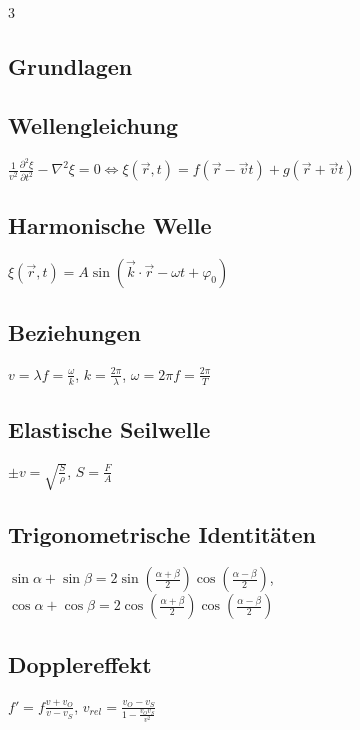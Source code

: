 \documentclass{article}
\begin{document}
\begin{multicols*}{3} 

\vspace{-10pt}

\begin{tcolorbox}[colframe=bg1]
\section{Grundlagen}
\subsection{Wellengleichung}
$\frac{1}{v^2} \frac{\partial^2 \xi}{\partial t^2} - \nabla^2 \xi = 0
\iff \xi(\vec{r}, t) = f(\vec{r} - \vec{v} t) + g(\vec{r} + \vec{v} t)$
\vspace{10pt}

\subsection{Harmonische Welle}
$\xi(\vec{r}, t) = A \sin(\vec{k} \cdot \vec{r} - \omega t + \varphi_0)$
\vspace{10pt}

\subsection{Beziehungen}
$v = \lambda f = \frac{\omega}{k}$, \quad
$k = \frac{2 \pi}{\lambda}$, \quad
$\omega = 2 \pi f = \frac{2 \pi}{T}$
\vspace{10pt}

\subsection{Elastische Seilwelle}
$\pm v = \sqrt{\frac{S}{\rho}}$, \quad
$S = \frac{F}{A}$
\vspace{10pt}

\subsection{Trigonometrische Identitäten}
$\sin \alpha + \sin \beta = 2 \sin\left(\frac{\alpha + \beta}{2}\right) \cos\left(\frac{\alpha - \beta}{2}\right)$, \\
\vspace{10pt}
$\cos \alpha + \cos \beta = 2 \cos\left(\frac{\alpha + \beta}{2}\right) \cos\left(\frac{\alpha - \beta}{2}\right)$

\subsection{Dopplereffekt}
$f' = f \frac{v + v_O}{v - v_S}$, \quad
$v_{rel} = \frac{v_O - v_S}{1 - \frac{v_O v_S}{v^2}}$ 
\end{tcolorbox}

\end{multicols*}
\end{document}
